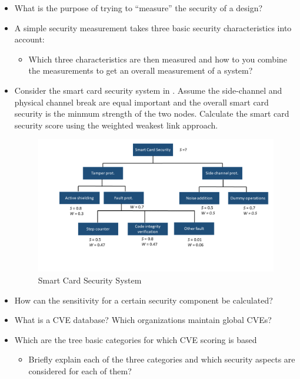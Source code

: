 \begin{itemize}
\item What is the purpose of trying to ``measure'' the security of a design?
\item A simple security measurement takes three basic security characteristics into account:
  \begin{itemize}[noitemsep]
  \item Which three characteristics are then measured and how to you combine the measurements to get an overall measurement of a system?
  \end{itemize}

\item Consider the smart card security system in .
  Assume the side-channel and physical channel break are equal important and the overall smart card security is the minmum strength of the two nodes.
  Calculate the smart card security score using the weighted weakest link approach.
  \begin{figure}[h!]
    \centering
    \includegraphics[scale=0.35]{./Drawings/EITP20-Secure_Systems_Engineering/Smart_Card_Security_System.png}
    \caption{Smart Card Security System}
    \label{fig:Smart_Card_Security_System}
  \end{figure}


\item How can the sensitivity for a certain security component be calculated?
\item What is a CVE database? Which organizations maintain global CVEs?
\item Which are the tree basic categories for which CVE scoring is based
  \begin{itemize}[noitemsep]
  \item Briefly explain each of the three categories and which security aspects are considered for each of them?
  \end{itemize}


\end{itemize}
